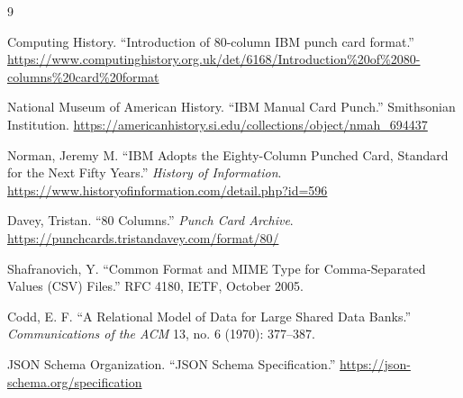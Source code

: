 \documentclass[11pt]{article}
\begin{document}
\begin{thebibliography}{9}

Computing History. ``Introduction of 80-column IBM punch card format.'' \url{https://www.computinghistory.org.uk/det/6168/Introduction\%20of\%2080-columns\%20card\%20format}

National Museum of American History. ``IBM Manual Card Punch.'' Smithsonian Institution. \url{https://americanhistory.si.edu/collections/object/nmah_694437}

Norman, Jeremy M. ``IBM Adopts the Eighty-Column Punched Card, Standard for the Next Fifty Years.'' \emph{History of Information}. \url{https://www.historyofinformation.com/detail.php?id=596}

Davey, Tristan. ``80 Columns.'' \emph{Punch Card Archive}. \url{https://punchcards.tristandavey.com/format/80/}

Shafranovich, Y. ``Common Format and MIME Type for Comma-Separated Values (CSV) Files.'' RFC 4180, IETF, October 2005.

Codd, E. F. ``A Relational Model of Data for Large Shared Data Banks.'' \emph{Communications of the ACM} 13, no. 6 (1970): 377--387.

JSON Schema Organization. ``JSON Schema Specification.'' \url{https://json-schema.org/specification}

\end{thebibliography}
\end{document}
